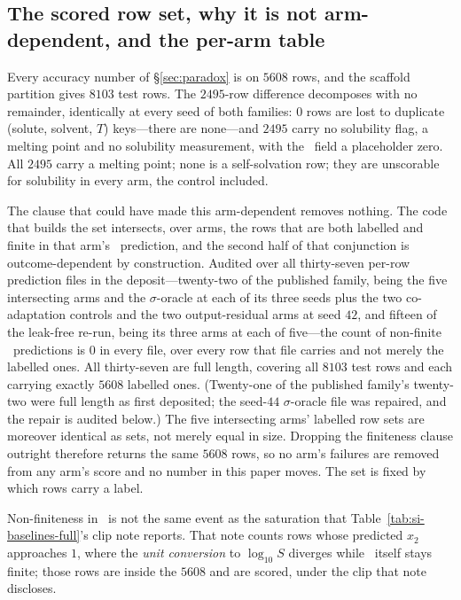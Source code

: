 \subsection{The scored row set, why it is not arm-dependent, and the per-arm table}
\label{sec:si-lock}
Every accuracy number of \S\ref{sec:paradox} is on $5608$ rows, and the scaffold partition gives
$8103$ test rows. The $2495$-row difference decomposes with no remainder, identically at every seed of both
families: $0$ rows are lost to duplicate (solute, solvent, $T$) keys---there are none---and $2495$
carry no solubility flag, a melting point and no solubility measurement, with the
\lnx\ field a placeholder zero. All $2495$ carry a melting point; none is a self-solvation row; they
are unscorable for solubility in every arm, the control included.

The clause that could have made this arm-dependent removes nothing. The code that builds the set
intersects, over arms, the rows that
are both labelled and finite in that arm's \lnx\ prediction, and the second half of that conjunction
is outcome-dependent by construction. Audited over all thirty-seven per-row prediction files in the deposit---twenty-two of the
published family, being the five intersecting arms and the $\sigma$-oracle at each of its three
seeds plus the two co-adaptation controls and the two output-residual arms at seed $42$, and fifteen
of the leak-free re-run, being its three arms at each of five---the count of non-finite \lnx\
predictions is $0$ in every file, over every row that file carries and not merely the labelled ones.
All thirty-seven are full length, covering all $8103$ test rows and each carrying exactly $5608$
labelled ones. (Twenty-one of the published family's twenty-two were full length as first deposited;
the seed-$44$ $\sigma$-oracle file was repaired, and the repair is audited below.) The five intersecting arms'
labelled row sets are moreover identical as sets, not merely equal
in size. Dropping the finiteness clause outright
therefore returns the same $5608$ rows, so no arm's failures are removed from any arm's score and
no number in this paper moves. The set is fixed by which rows carry a label.

Non-finiteness in \lnx\ is not the same event as the saturation that Table~\ref{tab:si-baselines-full}'s
clip note reports. That note counts rows whose predicted $x_2$ approaches $1$, where the \emph{unit conversion}
to $\log_{10}S$ diverges while \lnx\ itself stays finite; those rows are inside the $5608$ and are
scored, under the clip that note discloses.

